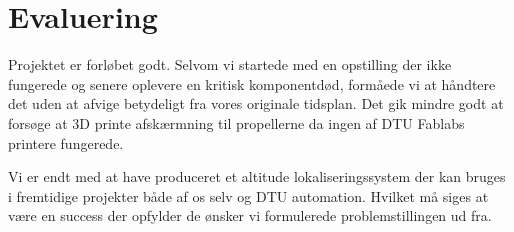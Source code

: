 \section*{Evaluering}
Projektet er forløbet godt. Selvom vi startede med en opstilling der ikke fungerede og senere oplevere en kritisk komponentdød, formåede vi at
håndtere det uden at afvige betydeligt fra vores originale tidsplan. Det gik mindre godt at forsøge at 3D printe afskærmning til propellerne
da ingen af DTU Fablabs printere fungerede.

Vi er endt med at have produceret et altitude lokaliseringssystem der kan bruges i fremtidige projekter både af os selv og DTU automation. Hvilket
må siges at være en success der opfylder de ønsker vi formulerede problemstillingen ud fra.


